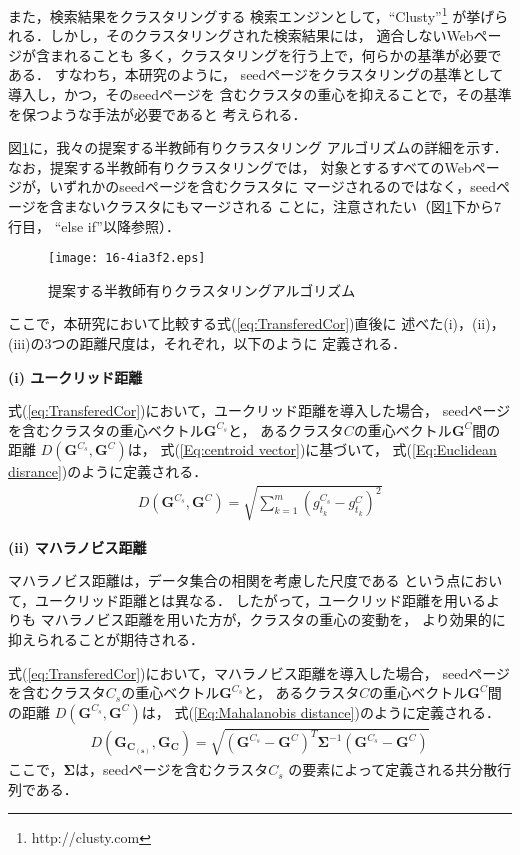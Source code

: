 \documentclass[japanese]{jnlp_1.4}
\begin{document}
また，検索結果をクラスタリングする
検索エンジンとして，``Clusty''\footnote{http://clusty.com}
が挙げられる．しかし，そのクラスタリングされた検索結果には，
適合しないWebページが含まれることも
多く，クラスタリングを行う上で，何らかの基準が必要である．
すなわち，本研究のように，
seedページをクラスタリングの基準として導入し，かつ，そのseedページを
含むクラスタの重心を抑えることで，その基準を保つような手法が必要であると
考えられる．

図\ref{Fig:SSClsAlgorithm}に，我々の提案する半教師有りクラスタリング
アルゴリズムの詳細を示す．なお，提案する半教師有りクラスタリングでは，
対象とするすべてのWebページが，いずれかのseedページを含むクラスタに
マージされるのではなく，seedページを含まないクラスタにもマージされる
ことに，注意されたい（図\ref{Fig:SSClsAlgorithm}下から7行目，
``else if''以降参照）．

\begin{figure}[p]
\begin{center}
\texttt{[image: 16-4ia3f2.eps]}
\end{center}
\caption{提案する半教師有りクラスタリングアルゴリズム} \label{Fig:SSClsAlgorithm}
\end{figure}

ここで，本研究において比較する式(\ref{eq:TransferedCor})直後に
述べた(i)，(ii)，(iii)の3つの距離尺度は，それぞれ，以下のように
定義される．


\noindent
\textbf{(i) ユークリッド距離}

式(\ref{eq:TransferedCor})において，ユークリッド距離を導入した場合，
seedページを含むクラスタの重心ベクトル$\boldsymbol{G}^{C_{s}}$と，
あるクラスタ$C$の重心ベクトル$\boldsymbol{G}^{C}$間の距離
$D(\boldsymbol{G}^{C_{s}},\boldsymbol{G}^{C})$は，
式(\ref{Eq:centroid vector})に基づいて，
式(\ref{Eq:Euclidean disrance})のように定義される．
\begin{eqnarray}
 D(\boldsymbol{G}^{C_{s}},\boldsymbol{G}^{C})=\sqrt{\sum_{k=1}^{m}(g^{C_{s}}_{t_{k}}-g^{C}_{t_{k}})^{2}}
\label{Eq:Euclidean disrance}
\end{eqnarray}

\noindent
\textbf{(ii) マハラノビス距離}

マハラノビス距離は，データ集合の相関を考慮した尺度である
という点において，ユークリッド距離とは異なる．
したがって，ユークリッド距離を用いるよりも
マハラノビス距離を用いた方が，クラスタの重心の変動を，
より効果的に抑えられることが期待される．

式(\ref{eq:TransferedCor})において，マハラノビス距離を導入した場合，
seedページを含むクラスタ$C_{s}$の重心ベクトル$\boldsymbol{G}^{C_{s}}$と，
あるクラスタ$C$の重心ベクトル$\boldsymbol{G}^{C}$間の距離
$D(\boldsymbol{G}^{C_{s}},\boldsymbol{G}^{C})$は，
式(\ref{Eq:Mahalanobis distance})のように定義される．
\begin{eqnarray}
D(\boldsymbol{G_{C_{(s)}}},\boldsymbol{G_{C}})
=\sqrt{(\boldsymbol{G}^{C_{s}}-\boldsymbol{G}^{C})^{T}\boldsymbol{\Sigma}^{-1}(\boldsymbol{G}^{C_{s}}-\boldsymbol{G}^{C})} \label{Eq:Mahalanobis distance}
\end{eqnarray}
ここで，$\boldsymbol{\Sigma}$は，seedページを含むクラスタ$C_{s}$
の要素によって定義される共分散行列である．
\end{document}
